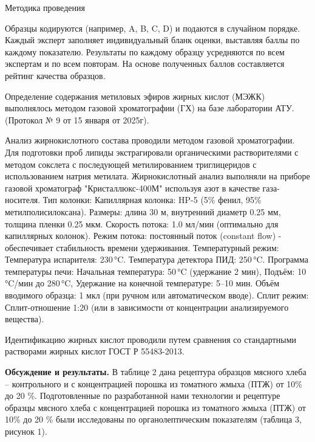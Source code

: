 \begin{multicols}{2}
Методика проведения

Образцы кодируются (например, A, B, C, D) и подаются в случайном
порядке. Каждый эксперт заполняет индивидуальный бланк оценки, выставляя
баллы по каждому показателю. Результаты по каждому образцу усредняются
по всем экспертам и по всем повторам. На основе полученных баллов
составляется рейтинг качества образцов.

Определение содержания метиловых эфиров жирных кислот (МЭЖК) выполнялось
методом газовой хроматографии (ГХ) на базе лаборатории АТУ. (Протокол №
9 от 15 января от 2025г).

Анализ жирнокислотного состава проводили методом газовой хроматографии.
Для подготовки проб липиды экстрагировали органическими растворителями с
методом сокслета с последующей метилированием триглицеридов с
использованием натрия метилата. Жирнокислотный анализ выполняли на
приборе газовой хроматограф "Кристаллюкс-400М" используя азот в качестве
газа-носителя. Тип колонки: Капиллярная колонка: HP-5 (5\% фенил, 95\%
метилполисилоксана). Размеры: длина 30 м, внутренний диаметр 0.25 мм,
толщина пленки 0.25 мкм. Скорость потока: 1.0 мл/мин (оптимально для
капиллярных колонок). Режим потока: постоянный поток (constant flow) -
обеспечивает стабильность времени удерживания. Температурный режим:
Температура испарителя: 230\,°C. Температура детектора ПИД: 250\,°C.
Программа температуры печи: Начальная температура: 50\,°C (удержание 2
мин), Подъём: 10\,°C/мин до 280\,°C, Удержание на конечной температуре:
5--10 мин. Объём вводимого образца: 1 мкл (при ручном или автоматическом
вводе). Сплит режим: Сплит-отношение 1:20 (или в зависимости от
концентрации анализируемого вещества).

Идентификацию жирных кислот проводили путем сравнения со стандартными
растворами жирных кислот ГОСТ Р 55483-2013.

{\bfseries Обсуждение и результаты.} В таблице 2 дана рецептура образцов
мясного хлеба -- контрольного и с концентрацией порошка из томатного
жмыха (ПТЖ) от 10\% до 20 \%. Подготовленные по разработанной нами
технологии и рецептуре образцы мясного хлеба с концентрацией порошка из
томатного жмыха (ПТЖ) от 10\% до 20 \% были исследованы по
органолептическим показателям (таблица 3, рисунок 1).
\end{multicols}

